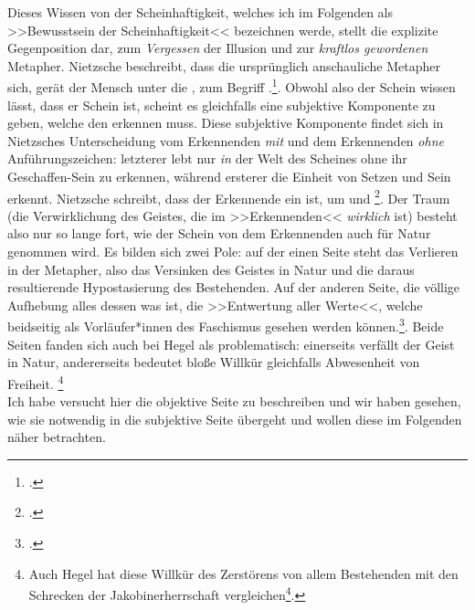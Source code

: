 \documentclass[12pt, a4paper, openany]{report}
\begin{document}
Dieses Wissen von der Scheinhaftigkeit, welches ich im Folgenden als >>Bewusstsein der Scheinhaftigkeit<< bezeichnen werde, stellt die explizite Gegenposition dar, zum \emph{Vergessen} der Illusion und zur \emph{kraftlos gewordenen} Metapher.
Nietzsche beschreibt, dass die ursprünglich anschauliche Metapher sich, gerät der Mensch unter die , zum Begriff .\footcite[][881]{nietzsche_geburt_1999}.
Obwohl also der Schein wissen lässt, dass er Schein ist, scheint es gleichfalls eine subjektive Komponente zu geben, welche den  erkennen muss.
Diese subjektive Komponente findet sich in Nietzsches Unterscheidung vom Erkennenden \emph{mit} und dem Erkennenden \emph{ohne} Anführungszeichen:
letzterer lebt nur \emph{in} der Welt des Scheines ohne ihr Geschaffen-Sein zu erkennen, während ersterer die Einheit von Setzen und Sein erkennt. 
Nietzsche schreibt, dass der Erkennende ein  ist, um  und \footcite[][417]{nietzsche_morgenrote_1999}.
Der Traum (die Verwirklichung des Geistes, die im >>Erkennenden<< \emph{wirklich} ist) besteht also nur so lange fort, wie der Schein von dem Erkennenden auch für Natur genommen wird. 
Es bilden sich zwei Pole:
auf der einen Seite steht das Verlieren in der Metapher, also das Versinken des Geistes in Natur und die daraus resultierende Hypostasierung des Bestehenden.
Auf der anderen Seite, die völlige Aufhebung alles dessen was ist, die >>Entwertung aller Werte<<, welche beidseitig als Vorläufer*innen des Faschismus gesehen werden können.\footcite[Vergleiche dazu beispielsweise:][S. 61, S. 69]{stephan_nietzscheanismus_2019}.
Beide Seiten fanden sich auch bei Hegel als problematisch:
einerseits verfällt der Geist in Natur, andererseits bedeutet bloße Willkür gleichfalls Abwesenheit von Freiheit.%
\footnote{
    Auch Hegel hat diese Willkür des Zerstörens von allem Bestehenden mit den Schrecken der Jakobinerherrschaft vergleichen\footcite[Vgl.][39]{hegel_grundlinien_2017}.
}\\

Ich habe versucht hier die objektive Seite zu beschreiben und wir haben gesehen, wie sie notwendig in die subjektive Seite übergeht und wollen diese im Folgenden näher betrachten.
\end{document}
